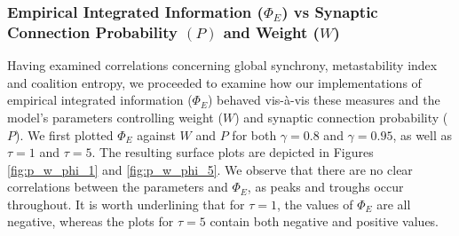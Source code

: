 \documentclass[a4paper,11pt]{article}
\begin{document}
\subsubsection{Empirical Integrated Information ($\Phi_E$) vs Synaptic Connection Probability $(P)$ and Weight ($W$)}
\label{sec:app:snn:res:phi-p-w}
Having examined correlations concerning global synchrony, metastability index and coalition entropy, we proceeded to examine how our implementations of empirical integrated information ($\Phi_E$) behaved vis-\`{a}-vis these measures and the model's parameters controlling weight ($W$) and synaptic connection probability ($P$). We first plotted $\Phi_E$ against $W$ and $P$ for both $\gamma = 0.8$ and $\gamma = 0.95$, as well as $\tau = 1$ and $\tau = 5$. The resulting surface plots are depicted in Figures \ref{fig:p_w_phi_1} and \ref{fig:p_w_phi_5}. We observe that there are no clear correlations between the parameters and $\Phi_E$, as peaks and troughs occur throughout. It is worth underlining that for $\tau = 1$, the values of $\Phi_E$ are all negative, whereas the plots for $\tau = 5$ contain both negative and positive values.
\end{document}
